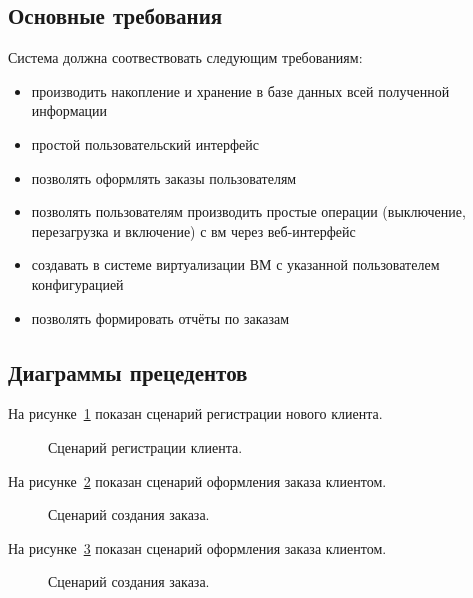 \subsection{Основные требования}\label{sec:usecase_umls}
Система должна соотвествовать следующим требованиям:
\begin{itemize}
  \item производить накопление и хранение в базе данных всей полученной информации
  \item простой пользовательский интерфейс
  \item позволять оформлять заказы пользователям
  \item позволять пользователям производить простые операции (выключение, перезагрузка и включение) с вм через веб-интерфейс
  \item создавать в системе виртуализации ВМ с указанной пользователем конфигурацией
  \item позволять формировать отчёты по заказам
\end{itemize}

\subsection{Диаграммы прецедентов}\label{sec:usecase_umls}
На рисунке~\ref{fig:umls_register_ucesace} показан сценарий регистрации нового клиента.
\begin{figure}[ht]
  \caption{Сценарий регистрации клиента.}\label{fig:umls_register_ucesace}
\end{figure}

На рисунке~\ref{fig:umls_make_order_usecase} показан сценарий оформления заказа клиентом.
\begin{figure}[ht]
  \caption{Сценарий создания заказа.}\label{fig:umls_make_order_usecase}
\end{figure}

На рисунке~\ref{fig:umls_report_request_usecase} показан сценарий оформления заказа клиентом.
\begin{figure}[ht]
  \caption{Сценарий создания заказа.}\label{fig:umls_report_request_usecase}
\end{figure}

